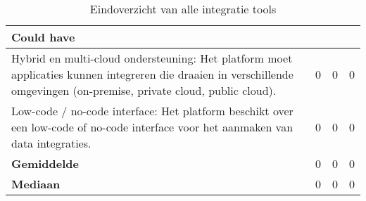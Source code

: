 \begin{landscape}
\begin{table}[H]
{\begin{tabular}{|llll|}
\textbf{Could have}                                                                                                                                                                                                        &                                     &                                      &                       \\ \hline
\multicolumn{1}{|l|}{Hybrid en multi-cloud ondersteuning: Het platform moet applicaties kunnen integreren die draaien in verschillende omgevingen (on-premise, private cloud, public cloud).}                              & \multicolumn{1}{l|}{0}              & \multicolumn{1}{l|}{0}               & 0                     \\ \hline
\multicolumn{1}{|l|}{Low-code / no-code interface: Het platform beschikt over een low-code of no-code interface voor het aanmaken van data integraties.}                                                                   & \multicolumn{1}{l|}{0}              & \multicolumn{1}{l|}{0}               & 0                     \\ \hline
\multicolumn{1}{|l|}{\textbf{Gemiddelde}}                                                                                                                                                                                  & \multicolumn{1}{l|}{0}              & \multicolumn{1}{l|}{0}               & 0                     \\ \hline
\multicolumn{1}{|l|}{\textbf{Mediaan}}                                                                                                                                                                                     & \multicolumn{1}{l|}{0}              & \multicolumn{1}{l|}{0}               & 0                     \\ \hline
\end{tabular}
}
\caption{Eindoverzicht van alle integratie tools}
\end{table}

\end{landscape}
